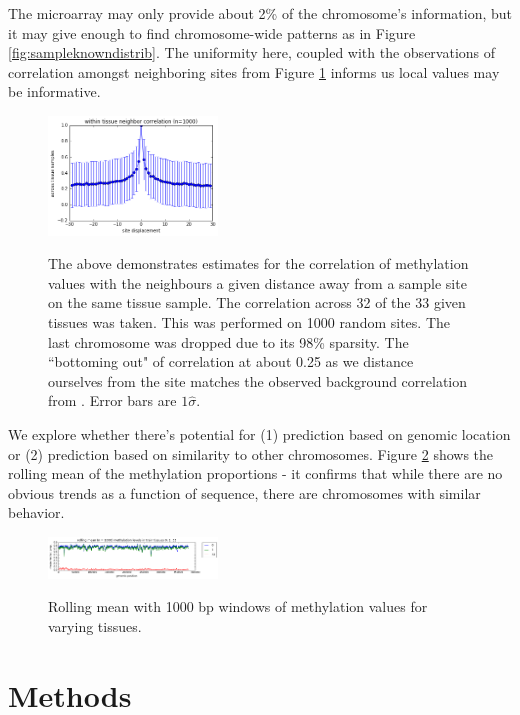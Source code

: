 \documentclass{article} %
\begin{document}
The microarray may only provide about 2\% of the chromosome's information, but it may give enough to find chromosome-wide patterns as in Figure \ref{fig:sampleknowndistrib}. The uniformity here, coupled with the observations of correlation amongst neighboring sites from Figure \ref{fig:colocalsite} informs us local values may be informative.

\begin{figure}[H]
    \centering
    \includegraphics[width=0.4\textwidth]{colocalisitecorr.png}
    \label{fig:colocalsite}
    \caption{The above demonstrates estimates for the correlation of methylation values with the neighbours a given distance away from a sample site on the same tissue sample. The correlation across 32 of the 33 given tissues was taken. This was performed on 1000 random sites. The last chromosome was dropped due to its 98\% sparsity. The ``bottoming out" of correlation at about 0.25 as we distance ourselves from the site matches the observed background correlation from \cite{zhang2015predicting}. Error bars are $1\hat{\sigma}$.}
\end{figure}

We explore whether there's potential for (1) prediction based on genomic location or (2) prediction based on similarity to other chromosomes. Figure \ref{fig:genomictrends} shows the rolling mean of the methylation proportions - it confirms that while there are no obvious trends as a function of sequence, there are chromosomes with similar behavior.

\begin{figure}[H]
    \centering
    \includegraphics[width=0.4\textwidth]{genomictrends.png}
    \label{fig:genomictrends}
    \caption{Rolling mean with 1000 bp windows of methylation values for varying tissues.}
\end{figure}


\section{Methods}
\end{document}
